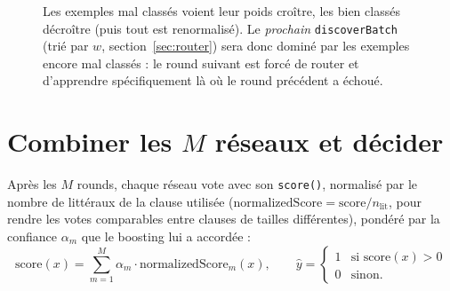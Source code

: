 \documentclass[12pt,a4paper]{article}
\newcommand{\code}[1]{\texttt{#1}}
\theoremstyle{remark}
\begin{document}
\begin{figure}[h]
\centering
{}
\caption{Les exemples mal classés voient leur poids croître, les bien classés
décroître (puis tout est renormalisé). Le \emph{prochain} \code{discoverBatch}
(trié par $w$, section~\ref{sec:router}) sera donc dominé par les exemples
encore mal classés : le round suivant est forcé de router et d'apprendre
spécifiquement là où le round précédent a échoué.}
\label{fig:adaboost}
\end{figure}

\section{Combiner les $M$ réseaux et décider}\label{sec:combine}

Après les $M$ rounds, chaque réseau vote avec son \code{score()}, normalisé par
le nombre de littéraux de la clause utilisée ($\mathrm{normalizedScore} =
\mathrm{score}/n_{\mathrm{lit}}$, pour rendre les votes comparables entre
clauses de tailles différentes), pondéré par la confiance $\alpha_m$ que le
boosting lui a accordée :
\[
  \mathrm{score}(x) = \sum_{m=1}^{M} \alpha_m \cdot \mathrm{normalizedScore}_m(x),
  \qquad
  \hat y = \begin{cases}1 & \text{si } \mathrm{score}(x) > 0\\ 0 & \text{sinon.}\end{cases}
\]
\end{document}
